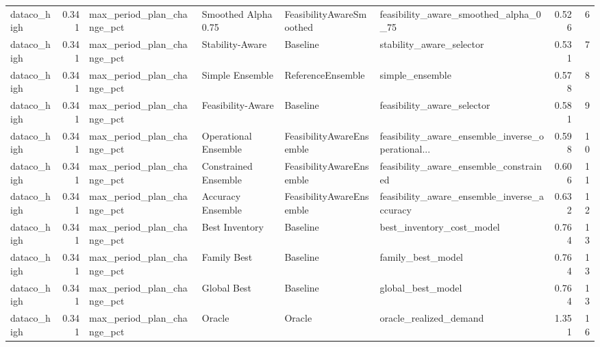 \begin{table}
{\begin{tabular}{lrllllrr}
   dataco\_high &             0.341 &  max\_period\_plan\_change\_pct &   Smoothed Alpha 0.75 &  FeasibilityAwareSmoothed &              feasibility\_aware\_smoothed\_alpha\_0\_75 &         0.526 &               6 \\
   dataco\_high &             0.341 &  max\_period\_plan\_change\_pct &       Stability-Aware &                  Baseline &                           stability\_aware\_selector &         0.531 &               7 \\
   dataco\_high &             0.341 &  max\_period\_plan\_change\_pct &       Simple Ensemble &         ReferenceEnsemble &                                    simple\_ensemble &         0.578 &               8 \\
   dataco\_high &             0.341 &  max\_period\_plan\_change\_pct &     Feasibility-Aware &                  Baseline &                         feasibility\_aware\_selector &         0.581 &               9 \\
   dataco\_high &             0.341 &  max\_period\_plan\_change\_pct &  Operational Ensemble &  FeasibilityAwareEnsemble &  feasibility\_aware\_ensemble\_inverse\_operational... &         0.598 &              10 \\
   dataco\_high &             0.341 &  max\_period\_plan\_change\_pct &  Constrained Ensemble &  FeasibilityAwareEnsemble &             feasibility\_aware\_ensemble\_constrained &         0.606 &              11 \\
   dataco\_high &             0.341 &  max\_period\_plan\_change\_pct &     Accuracy Ensemble &  FeasibilityAwareEnsemble &        feasibility\_aware\_ensemble\_inverse\_accuracy &         0.632 &              12 \\
   dataco\_high &             0.341 &  max\_period\_plan\_change\_pct &        Best Inventory &                  Baseline &                          best\_inventory\_cost\_model &         0.764 &              13 \\
   dataco\_high &             0.341 &  max\_period\_plan\_change\_pct &           Family Best &                  Baseline &                                  family\_best\_model &         0.764 &              13 \\
   dataco\_high &             0.341 &  max\_period\_plan\_change\_pct &           Global Best &                  Baseline &                                  global\_best\_model &         0.764 &              13 \\
   dataco\_high &             0.341 &  max\_period\_plan\_change\_pct &                Oracle &                    Oracle &                             oracle\_realized\_demand &         1.351 &              16 \\

\end{tabular}}
\end{table}
